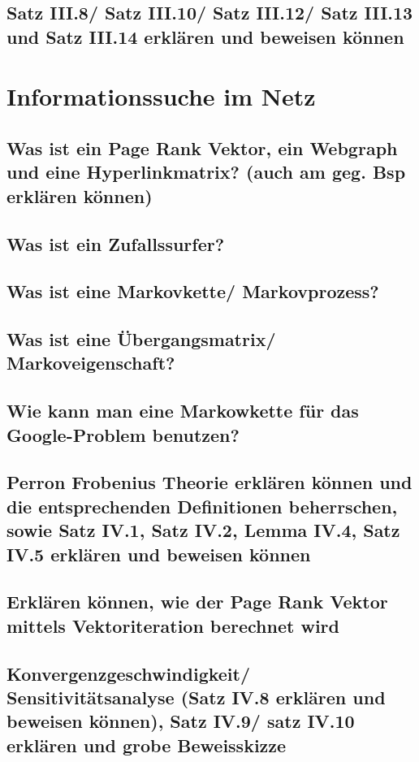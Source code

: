 \documentclass[]{article}
\begin{document}
\subsection*{Satz III.8/ Satz III.10/ Satz III.12/ Satz III.13 und Satz III.14 erklären und beweisen können} 

\section{Informationssuche im Netz}

\subsection*{Was ist ein Page Rank Vektor, ein Webgraph und eine Hyperlinkmatrix? (auch am geg. Bsp erklären können)}

\subsection*{Was ist ein Zufallssurfer? }

\subsection*{Was ist eine Markovkette/ Markovprozess? }

\subsection*{Was ist eine Übergangsmatrix/ Markoveigenschaft?}

\subsection*{Wie kann man eine Markowkette für das Google-Problem benutzen? }

\subsection*{Perron Frobenius Theorie erklären können und die entsprechenden Definitionen beherrschen, sowie Satz IV.1, Satz IV.2, Lemma IV.4, Satz IV.5 erklären und beweisen können}

\subsection*{Erklären können, wie der Page Rank Vektor mittels Vektoriteration berechnet wird}

\subsection*{Konvergenzgeschwindigkeit/ Sensitivitätsanalyse (Satz IV.8 erklären und beweisen können), Satz IV.9/ satz IV.10 erklären und grobe Beweisskizze}
\end{document}
